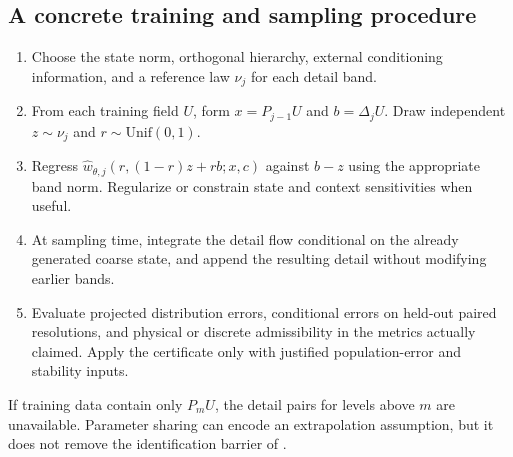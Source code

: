 \subsection{A concrete training and sampling procedure}
\begin{enumerate}
\item Choose the state norm, orthogonal hierarchy, external conditioning information, and a reference law $\nu_j$ for each detail band.
\item From each training field $U$, form $x=P_{j-1}U$ and $b=\Delta_jU$. Draw independent $z\sim\nu_j$ and $r\sim\mathrm{Unif}(0,1)$.
\item Regress $\widehat w_{\theta,j}(r,(1-r)z+rb;x,c)$ against $b-z$ using the appropriate band norm. Regularize or constrain state and context sensitivities when useful.
\item At sampling time, integrate the detail flow conditional on the already generated coarse state, and append the resulting detail without modifying earlier bands.
\item Evaluate projected distribution errors, conditional errors on held-out paired resolutions, and physical or discrete admissibility in the metrics actually claimed. Apply the certificate only with justified population-error and stability inputs.
\end{enumerate}
If training data contain only $P_mU$, the detail pairs for levels above $m$ are unavailable. Parameter sharing can encode an extrapolation assumption, but it does not remove the identification barrier of .

